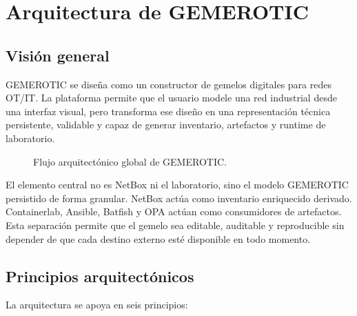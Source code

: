 \chapter{Arquitectura de GEMEROTIC} \label{ch:arquitectura}

\section{Visión general} \label{sec:vision-general-arquitectura}

GEMEROTIC se diseña como un constructor de gemelos digitales para redes OT/IT. La plataforma permite que el usuario modele una red industrial desde una interfaz visual, pero transforma ese diseño en una representación técnica persistente, validable y capaz de generar inventario, artefactos y runtime de laboratorio.

\begin{figure}[H]
    \centering
    \setlength{\fboxsep}{8pt}
    \caption{Flujo arquitectónico global de GEMEROTIC.}
    \label{fig:arquitectura-global}
\end{figure}

El elemento central no es NetBox ni el laboratorio, sino el modelo GEMEROTIC persistido de forma granular. NetBox actúa como inventario enriquecido derivado. Containerlab, Ansible, Batfish y OPA actúan como consumidores de artefactos. Esta separación permite que el gemelo sea editable, auditable y reproducible sin depender de que cada destino externo esté disponible en todo momento.

\section{Principios arquitectónicos} \label{sec:principios-arquitectonicos}

La arquitectura se apoya en seis principios:

